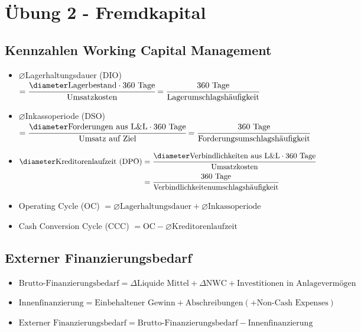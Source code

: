 \section{Übung 2 - Fremdkapital}

\subsection{Kennzahlen Working Capital Management}
\begin{itemize}
	\item $\diameter$Lagerhaltungsdauer (DIO) $=\cfrac{\diameter\text{Lagerbestand}\cdot 360\text{ Tage}}{\text{Umsatzkosten}}=\cfrac{360\text{ Tage}}{\text{Lagerumschlagshäufigkeit}}$
	\item $\diameter$Inkassoperiode (DSO) $=\cfrac{\diameter\text{Forderungen aus L\&L}\cdot 360\text{ Tage}}{\text{Umsatz auf Ziel}}=\cfrac{360\text{ Tage}}{\text{Forderungsumschlagshäufigkeit}}$
	\item 
	$
		\begin{aligned}[t]
			\diameter\text{Kreditorenlaufzeit (DPO)} & = \cfrac{\diameter\text{Verbindlichkeiten aus L\&L}\cdot 360\text{ Tage}}{\text{Umsatzkosten}} \\
			& = \cfrac{360\text{ Tage}}{\text{Verbindlichkeitenumschlagshäufigkeit}}
		\end{aligned}$
	\item Operating Cycle (OC) $=\diameter\text{Lagerhaltungsdauer}+\diameter\text{Inkassoperiode}$
	\item Cash Conversion Cycle (CCC) $= \text{OC}-\diameter\text{Kreditorenlaufzeit}$
\end{itemize}

\subsection{Externer Finanzierungsbedarf}
\begin{itemize}
	\item $\text{Brutto-Finanzierungsbedarf}=\Delta\text{Liquide Mittel}+\Delta\text{NWC}+\text{Investitionen in Anlagevermögen}$
	\item $\text{Innenfinanzierung}=\text{Einbehaltener Gewinn}+\text{Abschreibungen}(+\text{Non-Cash Expenses})$
	\item $\text{Externer Finanzierungsbedarf}=\text{Brutto-Finanzierungsbedarf}-\text{Innenfinanzierung}$
\end{itemize}

